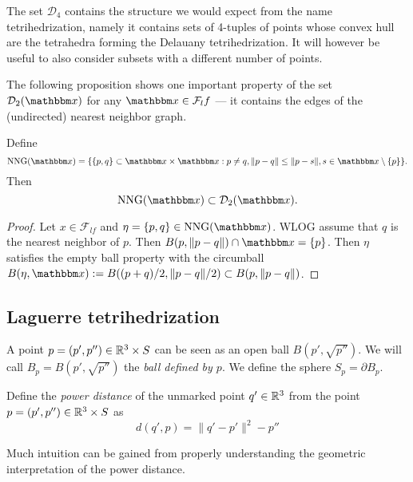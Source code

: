 The set $\mathcal D_4$ contains the structure we would expect from the name tetrihedrization, namely it contains sets of 4-tuples of points whose convex hull are the tetrahedra forming the Delauany tetrihedrization. It will however be useful to also consider subsets with a different number of points.




The following proposition shows one important property of the set $\mathcal D_2(\x)$ for any $\x \in \mathcal F_lf$ --- it contains the edges of the (undirected) nearest neighbor graph.
\begin{proposition}\label{prop:nng}
	Define 
	$$\text{NNG}(\x) = \{ \{p,q\}\subset \x \times \x: p\neq q, \|p-q\| \leq \|p-s\|, s\in \x\setminus\{p\}  \}.$$
	Then 
	$$\text{NNG}(\x) \subset \mathcal D_2(\x).$$
\end{proposition}
\begin{proof}
	Let $x\in\mathcal F_{lf}$ and $\eta =\{p,q\} \in \text{NNG}(\x)$. WLOG assume that $q$ is the nearest neighbor of $p$. Then $ B(p,\|p-q\|)\cap \x = \{p\}$. Then $\eta$ satisfies the empty ball property with the circumball $ B(\eta,\x) := B((p+q)/2,\|p-q\|/2) \subset B(p,\|p-q\|)$.
\end{proof}


\subsection{Laguerre tetrihedrization}
A point $p=(p',p'')\in {\mathbb R^3}\times S$ can be seen as an open ball $B(p',\sqrt{p''})$. We will call $B_p = B(p',\sqrt{p''})$ the \textit{ball defined by $p$}. We define the sphere $S_p=\partial B_p$. 


\begin{definition}
	Define the \textit{power distance} of the unmarked point $q'\in {\mathbb R^3}$ from the point $p=(p',p'')\in{\mathbb R^3}\times S$ as
$$d(q',p) = \|q'-p'\|^2 - p''$$
\end{definition}
Much intuition can be gained from properly understanding the geometric interpretation of the power distance.

